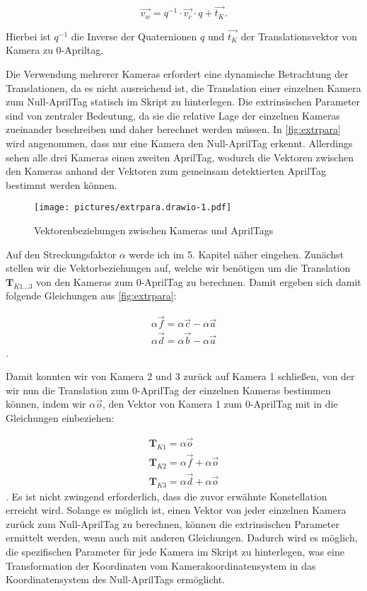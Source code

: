 \documentclass[ngerman]{article}    %
\theoremstyle{definition}
\begin{document}
\begin{equation}
    \vec{v_{w}} = q^{-1} \cdot \vec{v_{c}} \cdot q + \vec{t_{K}}
    \label{eq:17}.
\end{equation}


Hierbei ist \( q^{-1} \) die Inverse der Quaternionen \( q \) und \(\vec{t_{K}}\) der Translationsvektor von Kamera zu 0-Apriltag.

Die Verwendung mehrerer Kameras erfordert eine dynamische Betrachtung der Translationen, da es nicht ausreichend ist, die Translation einer einzelnen Kamera zum Null-AprilTag statisch im Skript zu hinterlegen. Die extrinsischen Parameter sind von zentraler Bedeutung, da sie die relative Lage der einzelnen Kameras zueinander beschreiben und daher berechnet werden müssen. In \autoref{fig:extrpara} wird angenommen, dass nur eine Kamera den Null-AprilTag erkennt. Allerdings sehen alle drei Kameras einen zweiten AprilTag, wodurch die Vektoren zwischen den Kameras anhand der Vektoren zum gemeinsam detektierten AprilTag bestimmt werden können.

\begin{figure}[htb]
    \centering
    \texttt{[image: pictures/extrpara.drawio-1.pdf]}
    \caption{Vektorenbeziehungen zwischen Kameras und AprilTags}
    \label{fig:extrpara}
\end{figure}

\FloatBarrier

Auf den Streckungsfaktor \(\alpha\) werde ich im 5. Kapitel näher eingehen. Zunächst stellen wir die Vektorbeziehungen auf, welche wir benötigen um die Translation \(\mathbf{T}_{K1...3}\) von den Kameras zum 0-AprilTag zu berechnen. Damit ergeben sich damit folgende Gleichungen aus \autoref{fig:extrpara}:

\begin{align}
    \alpha \vec{f} = \alpha \vec{c} - \alpha \vec{a}\\\alpha \vec{d} = \alpha \vec{b} - \alpha \vec{a}
\end{align}
. 

Damit konnten wir von Kamera 2 und 3 zurück auf Kamera 1 schließen, von der wir nun die Translation zum 0-AprilTag der einzelnen Kameras bestimmen können, indem wir \(\alpha\vec{o}\), den Vektor von Kamera 1 zum 0-AprilTag mit in die Gleichungen einbeziehen:

\begin{align}
    \mathbf{T}_{K1} = \alpha \vec{o}\\\mathbf{T}_{K2} = \alpha \vec{f} + \alpha \vec{o}\\\mathbf{T}_{K3} = \alpha \vec{d} + \alpha \vec{o}  
\end{align}
.
Es ist nicht zwingend erforderlich, dass die zuvor erwähnte Konstellation erreicht wird. Solange es möglich ist, einen Vektor von jeder einzelnen Kamera zurück zum Null-AprilTag zu berechnen, können die extrinsischen Parameter ermittelt werden, wenn auch mit anderen Gleichungen. Dadurch wird es möglich, die spezifischen Parameter für jede Kamera im Skript zu hinterlegen, was eine Transformation der Koordinaten vom Kamerakoordinatensystem in das Koordinatensystem des Null-AprilTags ermöglicht.
\end{document}
